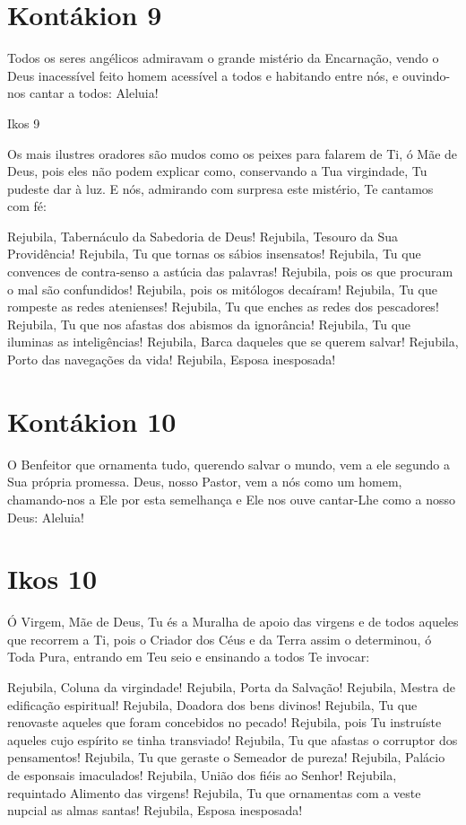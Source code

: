 \documentclass{subfiles}
\begin{document}
\section*{Kontákion 9}

Todos os seres angélicos admiravam o grande mistério da Encarnação,
vendo o Deus inacessível feito homem acessível a todos e habitando entre nós,
e ouvindo-nos cantar a todos: Aleluia!

Ikos 9

Os mais ilustres oradores são mudos como os peixes para falarem de
Ti, ó Mãe de Deus, pois eles não podem explicar como, conservando a Tua
virgindade, Tu pudeste dar à luz. E nós, admirando com surpresa este mistério,
Te cantamos com fé:

Rejubila, Tabernáculo da Sabedoria de Deus!
Rejubila, Tesouro da Sua Providência!
Rejubila, Tu que tornas os sábios insensatos!
Rejubila, Tu que convences de contra-senso a astúcia das palavras!
Rejubila, pois os que procuram o mal são confundidos!
Rejubila, pois os mitólogos decaíram!
Rejubila, Tu que rompeste as redes atenienses!
Rejubila, Tu que enches as redes dos pescadores!
Rejubila, Tu que nos afastas dos abismos da ignorância!
Rejubila, Tu que iluminas as inteligências!
Rejubila, Barca daqueles que se querem salvar!
Rejubila, Porto das navegações da vida!
Rejubila, Esposa inesposada!

\section*{Kontákion 10}

O Benfeitor que ornamenta tudo, querendo salvar o mundo, vem a ele
segundo a Sua própria promessa. Deus, nosso Pastor, vem a nós como um
homem, chamando-nos a Ele por esta semelhança e Ele nos ouve cantar-Lhe
como a nosso Deus: Aleluia!

\section*{Ikos 10}

Ó Virgem, Mãe de Deus, Tu és a Muralha de apoio das virgens e de
todos aqueles que recorrem a Ti, pois o Criador dos Céus e da Terra assim o
determinou, ó Toda Pura, entrando em Teu seio e ensinando a todos Te
invocar:

Rejubila, Coluna da virgindade!
Rejubila, Porta da Salvação!
Rejubila, Mestra de edificação espiritual!
Rejubila, Doadora dos bens divinos!
Rejubila, Tu que renovaste aqueles que foram concebidos no pecado!
Rejubila, pois Tu instruíste aqueles cujo espírito se tinha transviado!
Rejubila, Tu que afastas o corruptor dos pensamentos!
Rejubila, Tu que geraste o Semeador de pureza!
Rejubila, Palácio de esponsais imaculados!
Rejubila, União dos fiéis ao Senhor!
Rejubila, requintado Alimento das virgens!
Rejubila, Tu que ornamentas com a veste nupcial as almas santas!
Rejubila, Esposa inesposada!
\end{document}
